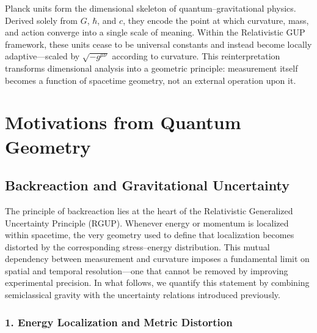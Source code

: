\documentclass[11pt,oneside]{book}
\newenvironment{booknote}{
  \begin{tcolorbox}[
    colback=gray!3!white,
    colframe=gray!45!black,
    fonttitle=\bfseries,
    title=\textbf{Book Note},
  ]
}{\end{tcolorbox}}
\numberwithin{equation}{chapter}
\begin{document}
\begin{booknote}
Planck units form the dimensional skeleton of quantum–gravitational physics.  
Derived solely from $G$, $\hbar$, and $c$, they encode the point at which curvature, mass, and action converge into a single scale of meaning.  
Within the Relativistic GUP framework, these units cease to be universal constants and instead become locally adaptive—scaled by $\sqrt{-g^{\mu\nu}}$ according to curvature.  
This reinterpretation transforms dimensional analysis into a geometric principle: measurement itself becomes a function of spacetime geometry, not an external operation upon it.
\end{booknote}


\chapter{Motivations from Quantum Geometry}
\section{Backreaction and Gravitational Uncertainty}

The principle of backreaction lies at the heart of the Relativistic Generalized Uncertainty Principle (RGUP).  
Whenever energy or momentum is localized within spacetime, the very geometry used to define that localization becomes distorted by the corresponding stress–energy distribution.  
This mutual dependency between measurement and curvature imposes a fundamental limit on spatial and temporal resolution—one that cannot be removed by improving experimental precision.  
In what follows, we quantify this statement by combining semiclassical gravity with the uncertainty relations introduced previously.

\subsection*{1. Energy Localization and Metric Distortion}
\end{document}
